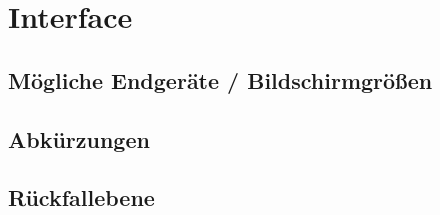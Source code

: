 \section{Interface}

\subsection{Mögliche Endgeräte / Bildschirmgrößen}
\subsection{Abkürzungen}
\subsection{Rückfallebene}